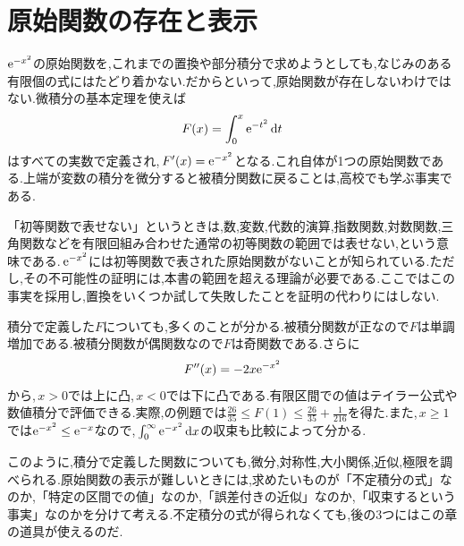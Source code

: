 \section{原始関数の存在と表示}\label{節:非初等原始関数}

$\mathrm{e}^{-x^2}$の原始関数を,これまでの置換や部分積分で求めようとしても,なじみのある有限個の式にはたどり着かない.だからといって,原始関数が存在しないわけではない.微積分の基本定理を使えば
\[
 F(x)=\int_0^x\mathrm{e}^{-t^2}\,\mathrm{d} t
\]
はすべての実数で定義され,\,$F'(x)=\mathrm{e}^{-x^2}$となる.これ自体が1つの原始関数である.上端が変数の積分を微分すると被積分関数に戻ることは,高校でも学ぶ事実である.

「初等関数で表せない」というときは,数,変数,代数的演算,指数関数,対数関数,三角関数などを有限回組み合わせた通常の初等関数の範囲では表せない,という意味である.\,$\mathrm{e}^{-x^2}$には初等関数で表された原始関数がないことが知られている.ただし,その不可能性の証明には,本書の範囲を超える理論が必要である.ここではこの事実を採用し,置換をいくつか試して失敗したことを証明の代わりにはしない.

積分で定義した$F$についても,多くのことが分かる.被積分関数が正なので$F$は単調増加である.被積分関数が偶関数なので$F$は奇関数である.さらに
\[
 F''(x)=-2x\mathrm{e}^{-x^2}
\]
から,\,$x>0$では上に凸,\,$x<0$では下に凸である.有限区間での値はテイラー公式や数値積分で評価できる.実際,の例題では$\frac{26}{35}\le F(1)\le\frac{26}{35}+\frac1{216}$を得た.また,\,$x\ge1$では$\mathrm{e}^{-x^2}\le\mathrm{e}^{-x}$なので,\,$\int_0^{\infty}\mathrm{e}^{-x^2}\,\mathrm{d} x$の収束も比較によって分かる.

このように,積分で定義した関数についても,微分,対称性,大小関係,近似,極限を調べられる.原始関数の表示が難しいときには,求めたいものが「不定積分の式」なのか,「特定の区間での値」なのか,「誤差付きの近似」なのか,「収束するという事実」なのかを分けて考える.不定積分の式が得られなくても,後の3つにはこの章の道具が使えるのだ.


